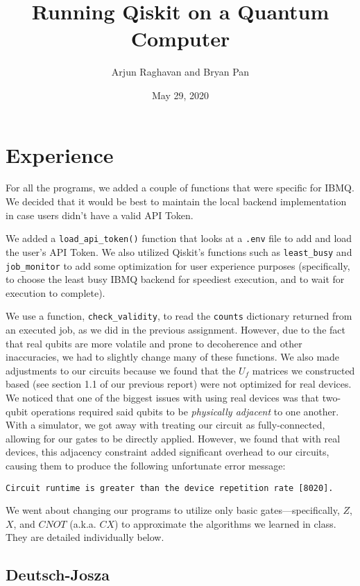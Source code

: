 \documentclass[12pt]{article}
\title{Running Qiskit on a Quantum Computer}
\author{Arjun Raghavan and Bryan Pan}
\date{May 29, 2020}
\begin{document}
\mktitle
\startbody

\section{Experience}
For all the programs, we added a couple of functions that were specific for IBMQ. We decided that it would be best to maintain the local backend implementation in case users didn’t have a valid API Token.

We added a \texttt{load\_api\_token()} function that looks at a \texttt{.env} file to add and load the user’s API Token. We also utilized Qiskit’s functions such as \texttt{least\_busy} and \texttt{job\_monitor} to add some optimization for user experience purposes (specifically, to choose the least busy IBMQ backend for speediest execution, and to wait for execution to complete).

We use a function, \texttt{check\_validity}, to read the \texttt{counts} dictionary returned from an executed job, as we did in the previous assignment.
However, due to the fact that real qubits are more volatile and prone to decoherence and other inaccuracies, we had to slightly change many of these functions.
We also made adjustments to our circuits because we found that the $U_f$ matrices we constructed based (see section 1.1 of our previous report) were not optimized for real devices.
We noticed that one of the biggest issues with using real devices was that two-qubit operations required said qubits to be \textit{physically adjacent} to one another.
With a simulator, we got away with treating our circuit as fully-connected, allowing for our gates to be directly applied.
However, we found that with real devices, this adjacency constraint added significant overhead to our circuits, causing them to produce the following unfortunate error message:
\begin{lstlisting}[numbers=none]
    Circuit runtime is greater than the device repetition rate [8020].
\end{lstlisting}
We went about changing our programs to utilize only basic gates---specifically, $Z$, $X$, and $CNOT$ (a.k.a. $CX$) to approximate the algorithms we learned in class.
They are detailed individually below.

\subsection{Deutsch-Josza}
\end{document}
